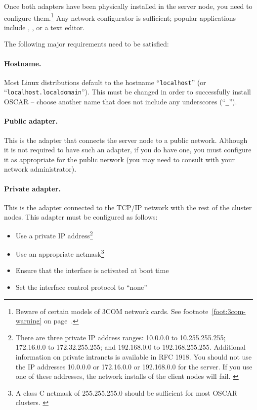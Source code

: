 \begchange

Once both adapters have been physically installed in the server node,
you need to configure them.\footnote{Beware of certain models of 3COM
  network cards.  See footnote~\ref{foot:3com-warning} on
  page~\pageref{foot:3com-warning}.}  Any network configurator is
sufficient; popular applications include , , or
a text editor.

The following major requirements need to be satisfied:

\paragraph{Hostname.} Most Linux distributions default to the hostname
``{\tt localhost}'' (or ``{\tt localhost.localdomain}'').  This must
be changed in order to successfully install OSCAR -- choose another
name that does not include any underscores (``{\tt \_}'').

\paragraph{Public adapter.}  This is the adapter that connects the
server node to a public network.  Although it is not required to have
such an adapter, if you do have one, you must configure it as
appropriate for the public network (you may need to consult with your
network administrator).

\paragraph{Private adapter.}  This is the adapter connected to
the TCP/IP network with the rest of the cluster nodes.  This adapter
must be configured as follows:

\begin{itemize}
\item Use a private IP address\footnote{There are three private IP
    address ranges: 10.0.0.0 to 10.255.255.255; 172.16.0.0 to
    172.32.255.255; and 192.168.0.0 to 192.168.255.255.  Additional
    information on private intranets is available in RFC 1918.  You
    should not use the IP addresses 10.0.0.0 or 172.16.0.0 or
    192.168.0.0 for the server.  If you use one of these addresses,
    the network installs of the client nodes will fail.
    \label{foot:private-ip-ranges}}

\item Use an appropriate netmask\footnote{A class C netmask of
    255.255.255.0 should be sufficient for most OSCAR clusters.
    \label{foot:netmask}} 

\item Ensure that the interface is activated at boot time

\item Set the interface control protocol to ``none''

\end{itemize}


